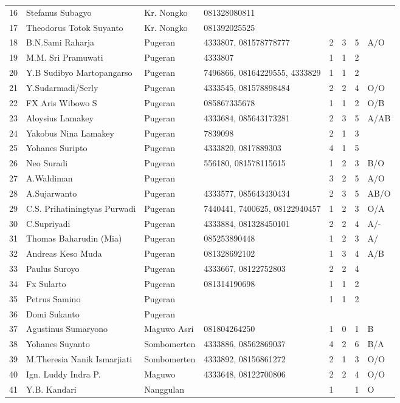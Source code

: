 \begin{longtable}{|r|l|l|p{1.7cm}|r|r|r|p{0.7cm}|}
16 &Stefanus Subagyo &Kr. Nongko &081328080811& & & &\\
17	&Theodorus Totok Suyanto	&Kr. Nongko	&081392025525	&	&	&	&\\
18	&B.N.Sami Raharja	&Pugeran	&4333807, 081578778777	&2	&3	&5	&A/O\\
19	&M.M. Sri Pramuwati	&Pugeran	&4333807	&1	&1	&2	&\\
20	&Y.B Sudibyo Martopangarso	&Pugeran	&7496866, 08164229555, 4333829	&1	&1	&2	&\\
21	&Y.Sudarmadi/Serly	&Pugeran	&4333545, 081578898484	&2	&2	&4	&O/O\\
22 & FX Aris Wibowo S & Pugeran &085867335678 & 1 & 1 & 2 & O/B\\
23	&Aloysius Lamakey	&Pugeran	&4333684, 085643173281	&2	&3	&5	&A/AB\\
24	&Yakobus Nina Lamakey	&Pugeran	&7839098	&2	&1	&3	&\\
25	&Yohanes Suripto	&Pugeran	&4333820, 0817889303	&4	&1	&5	&\\
26	&Neo Suradi	&Pugeran	&556180, 081578115615	&1	&2	&3	&B/O\\
27	&A.Waldiman	&Pugeran	&	&3	&2	&5	&A/O\\
28	&A.Sujarwanto	&Pugeran	&4333577, 085643430434	&2	&3	&5	&AB/O\\
29	&C.S. Prihatiningtyas Purwadi	&Pugeran	&7440441, 7400625, 08122940457	&1	&2	&3	&O/A\\
30	&C.Supriyadi	&Pugeran	&4333884, 081328450101	&2	&2	&4	&A/-\\
31	&Thomas Baharudin (Mia)	&Pugeran	&085253890448	&1	&2	&3	&A/\\
32	&Andreas Keso Muda	&Pugeran	&081328692102	&1	&3	&4	&A/B\\
33	&Paulus Suroyo	&Pugeran	&4333667, 08122752803	&2	&2	&4	&\\
34	&Fx Sularto	&Pugeran	&081314190698	&1	&1	&2	&\\
35	&Petrus Samino	&Pugeran	&	&1	&1	&2	&\\
36 &Domi Sukanto &Pugeran & & & & &\\
37 &Agustinus Sumaryono&Maguwo Asri&081804264250&1&0&1&B\\
38	&Yohanes Suyanto	&Sombomerten	&4333886, 08562869037	&4	&2	&6	&B/A\\
39	&M.Theresia Nanik Ismarjiati	&Sombomerten	&4333892, 08156861272	&2	&1	&3	&O/O\\
40	&Ign. Luddy Indra P.	&Maguwo	&4333648, 08122700806	&2	&2	&4	&O/O\\
41	&Y.B. Kandari	&Nanggulan 	&	&1	&	&1	&O\\

\end{longtable}
